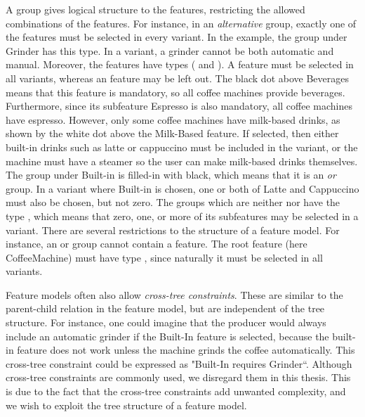 A group gives logical structure to the features, restricting the allowed combinations of the features. For instance, in an \emph{alternative} group, exactly one of the features must be selected in every variant. In the example, the group under Grinder has this type. In a variant, a grinder cannot be both automatic and manual. Moreover, the features have types (\optional{} and \mandatory{}). A \mandatory{} feature must be selected in all variants, whereas an \optional{} feature may be left out. The black dot above Beverages means that this feature is mandatory, so all coffee machines provide beverages. Furthermore, since its subfeature Espresso is also mandatory, all coffee machines have espresso. However, only some coffee machines have milk-based drinks, as shown by the white dot above the Milk-Based feature. If selected, then either built-in drinks such as latte or cappuccino must be included in the variant, or the machine must have a steamer so the user can make milk-based drinks themselves. The group under Built-in is filled-in with black, which means that it is an \emph{or} group. In a variant where Built-in is chosen, one or both of Latte and Cappuccino must also be chosen, but not zero. The groups which are neither \xortype{} nor \ortype{} have the type \andtype{}, which means that zero, one, or more of its subfeatures may be selected in a variant. There are several restrictions to the structure of a feature model. For instance, an \xortype{} or \ortype{} group cannot contain a \mandatory{} feature. The root feature (here CoffeeMachine) must have type \mandatory{}, since naturally it must be selected in all variants.

Feature models often also allow \emph{cross-tree constraints}. These are similar to the parent-child relation in the feature model, but are independent of the tree structure. For instance, one could imagine that the producer would always include an automatic grinder if the Built-In feature is selected, because the built-in feature does not work unless the machine grinds the coffee automatically. This cross-tree constraint could be expressed as "Built-In requires Grinder``. Although cross-tree constraints are commonly used, we disregard them in this thesis. This is due to the fact that the cross-tree constraints add unwanted complexity, and we wish to exploit the tree structure of a feature model.

